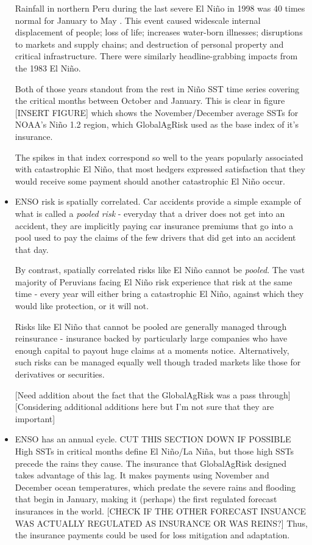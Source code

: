 \documentclass[authoryear]{article}
\begin{document}
\begin{itemize}
Rainfall in northern Peru during the last severe El Ni\~no in 1998 was 40 times normal for January to May \citep{skees2009enso}. This event caused widescale internal displacement of people; loss of life; increases water-born illnesses; disruptions to markets and supply chains; and destruction of personal property and critical infrastructure. There were similarly headline-grabbing impacts from the 1983 El Ni\~no.

Both of those years standout from the rest in Ni\~no SST time series covering the critical months between October and January. This is clear in figure [INSERT FIGURE] which shows the November/December average SSTs for NOAA's Ni\~no 1.2 region, which GlobalAgRisk used as the base index of it's insurance.

The spikes in that index correspond so well to the years popularly associated with catastrophic El Ni\~no, that most hedgers expressed satisfaction that they would receive some payment should another catastrophic El Ni\~no occur.

\item ENSO risk is spatially correlated.
Car accidents provide a simple example of what is called a \emph{pooled risk} - everyday that a driver does not get into an accident, they are implicitly paying car insurance premiums that go into a pool used to pay the claims of the few drivers that did get into an accident that day. 

By contrast, spatially correlated risks like El Ni\~no cannot be \emph{pooled}. The vast majority of Peruvians facing El Ni\~no risk experience that risk at the same time - every year will either bring a catastrophic El Ni\~no, against which they would like protection, or it will not. 

Risks like El Ni\~no that cannot be pooled are generally managed through reinsurance -  insurance backed by particularly large companies who have enough capital to payout huge claims at a moments notice. Alternatively, such risks can be managed equally well though traded markets like those for derivatives or securities. 

[Need addition about the fact that the GlobalAgRisk was a pass through]
[Considering additional additions here but I'm not sure that they are important]

\item ENSO has an annual cycle.
CUT THIS SECTION DOWN IF POSSIBLE
High SSTs in critical months define El Ni\~no/La Ni\~na, but those high SSTs precede the rains they cause. The insurance that GlobalAgRisk designed takes advantage of this lag. It makes payments using November and December ocean temperatures, which predate the severe rains and flooding that begin in January, making it (perhaps) the first regulated forecast insurances in the world. [CHECK IF THE OTHER FORECAST INSUANCE WAS ACTUALLY REGULATED AS INSURANCE OR WAS REINS?] Thus, the insurance payments could be used for loss mitigation and adaptation.


\end{itemize}
\end{document}
